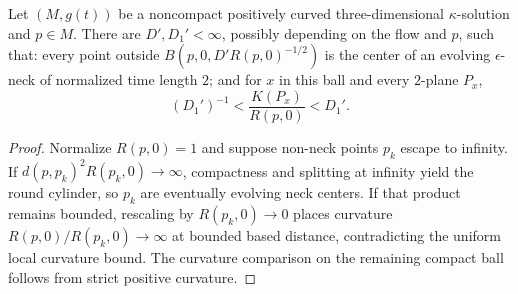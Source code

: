 \begin{lemma}\label{lem:noncompact-kappa-solution-neck-structure}
Let $(M,g(t))$ be a noncompact positively curved
three-dimensional $\kappa$-solution and $p\in M$. There are
$D',D_1'<\infty$, possibly depending on the flow and $p$, such that:
every point outside
$B(p,0,D'R(p,0)^{-1/2})$ is the center of an evolving
$\epsilon$-neck of normalized time length $2$; and for
$x$ in this ball and every $2$-plane $P_x$,
\[
 (D_1')^{-1}<\frac{K(P_x)}{R(p,0)}<D_1'.
\]
\end{lemma}
\begin{proof}
\sketch
{}
Normalize $R(p,0)=1$ and suppose non-neck points $p_k$ escape to
infinity. If $d(p,p_k)^2R(p_k,0)\to\infty$, compactness and splitting
at infinity yield the round cylinder, so $p_k$ are eventually
evolving neck centers. If that product remains bounded, rescaling by
$R(p_k,0)\to0$ places curvature $R(p,0)/R(p_k,0)\to\infty$ at
bounded based distance, contradicting the uniform local curvature
bound. The curvature comparison on the remaining compact ball
follows from strict positive curvature.
\end{proof}

